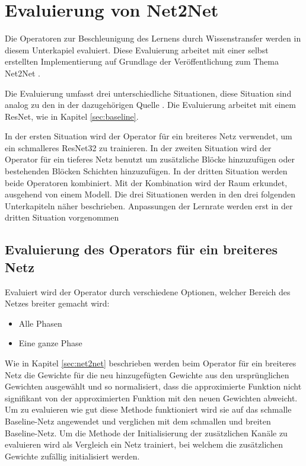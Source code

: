
\chapter{Evaluierung von Net2Net}\label{sec:net2netexperimente}
Die Operatoren zur Beschleunigung des Lernens durch Wissenstransfer werden in diesem Unterkapiel evaluiert. Diese Evaluierung arbeitet mit einer selbst erstellten Implementierung auf Grundlage der Veröffentlichung zum Thema Net2Net \cite{net2net}.

Die Evaluierung umfasst drei unterschiedliche Situationen, diese Situation sind analog zu den in der dazugehörigen Quelle \cite{net2net}. Die Evaluierung arbeitet mit einem ResNet, wie in Kapitel \ref{sec:baseline}.

In der ersten Situation wird der Operator für ein breiteres Netz verwendet, um ein schmalleres ResNet32 zu trainieren. 
In der zweiten Situation wird der Operator für ein tieferes Netz benutzt um zusätzliche Blöcke hinzuzufügen oder bestehenden Blöcken Schichten hinzuzufügen. In der dritten Situation werden beide Operatoren kombiniert. Mit der Kombination wird der Raum erkundet, ausgehend von einem Modell.
Die drei Situationen werden in den drei folgenden Unterkapiteln näher beschrieben. Anpassungen der Lernrate werden erst in der dritten Situation vorgenommen

\section{Evaluierung des Operators für ein breiteres Netz}
Evaluiert wird der Operator durch verschiedene Optionen, welcher Bereich des Netzes breiter gemacht wird:
\begin{itemize}
 \item Alle Phasen
 \item Eine ganze Phase
\end{itemize}
Wie in Kapitel \ref{sec:net2net} beschrieben werden beim Operator für ein breiteres Netz die Gewichte für die neu hinzugefügten Gewichte aus den ursprünglichen Gewichten ausgewählt und so normalisiert, dass die approximierte Funktion nicht signifikant von der approximierten Funktion mit den neuen Gewichten abweicht. Um zu evaluieren wie gut diese Methode funktioniert wird sie auf das schmalle Baseline-Netz angewendet und verglichen mit dem schmallen und breiten Baseline-Netz. Um die Methode der Initialisierung der zusätzlichen Kanäle zu evaluieren wird als Vergleich ein Netz trainiert, bei welchem die zusätzlichen Gewichte zufällig initialisiert werden.
\color{blue1}

